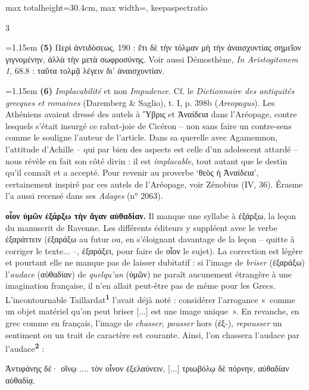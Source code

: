 \documentclass[11pt,twoside]{book}
\newcommand{\italique}[1]{\textit{#1}}
\newcommand{\citComm}[1]{\begin{quoting}[vskip=0.4pt,leftmargin=0.7em,rightmargin=0.2em]#1\end{quoting}}
\newcommand{\latin}[1]{\textit{#1}}
\newcommand{\marqueur}[1]{\textsuperscript{\color{rubricRed}\textbf{#1}}}
\begin{document}
\begin{adjustbox}{max totalheight=30.4cm, max width=\textwidth, keepaspectratio}
\begin{minipage}{\textwidth}
{\begin{multicols}{3}
\par\vspace{1.5pt}
\noindent\hangindent=1.15em {\color{sepiaNote}\textbf{(5)}} Περὶ ἀντιδόσεως, 190 : ἔτι δὲ τὴν τόλμαν μὴ τὴν ἀναισχυντίας σημεῖον γιγνομένην, ἀλλὰ τὴν μετὰ σωφροσύνης. Voir aussi Démosthène, \italique{In Aristogitonem 1}, 68.8 : ταῦτα τολμᾷ λέγειν δι' ἀναισχυντίαν.
\par\vspace{1.5pt}
\noindent\hangindent=1.15em {\color{sepiaNote}\textbf{(6)}} \italique{Implacabilité} et non \italique{Impudence}. Cf. le \italique{Dictionnaire des antiquités grecques et romaines} (Daremberg \& Saglio), t. I, p. 398b (\latin{Areopagus}). Les Athéniens avaient dressé des autels à Ὕβρις et Ἀναίδεια dans l'Aréopage, contre lesquels s'était insurgé ce rabat-joie de Cicéron -- non sans faire un contre-sens comme le souligne l'auteur de l'article. Dans sa querelle avec Agamemnon, l'attitude d'Achille -- qui par bien des aspects est celle d'un adolescent attardé -- nous révèle en fait son côté divin : il est \italique{implacable}, tout autant que le destin qu'il connaît et a accepté. Pour revenir au proverbe `θεὸς ἡ Ἀναίδεια', certainement inspiré par ces autels de l'Aréopage, voir Zénobius (IV, 36). Érasme l'a aussi recensé dans ses \italique{Adages} (n° 2063).
\par\vspace{1.5pt}
 \textbf{οἷον ὑμῶν ἐξάρξω τὴν ἄγαν αὐθαδίαν.} Il manque une syllabe à ἐξάρξω, la leçon du manuscrit de Ravenne. Les différents éditeurs y suppléent avec le verbe ἐξαράττειν (ἐξαράξω au futur ou, en s'éloignant davantage de la leçon -- quitte à corriger le texte... --, ἐξαράξει, pour faire de οἷον le sujet). La correction est légère et pourtant elle ne manque pas de laisser dubitatif : si l'image de \italique{briser} (ἐξαράξω) l'\italique{audace} (αὐθαδίαν) de \italique{quelqu'un} (ὑμῶν) ne paraît aucunement étrangère à une imagination française, il n'en allait peut-être pas de même pour les Grecs. L'incontournable Taillardat\marqueur{1} l'avait déjà noté : considérer l'arrogance «~comme un objet matériel qu'on peut briser [...] est une image unique~». En revanche, en grec comme en français, l'image de \italique{chasser}, \italique{pousser} hors (ἐξ-), \italique{repousser} un sentiment ou un trait de caractère est courante. Ainsi, l'on chassera l'audace par l'audace\marqueur{2} :
\citComm{Ἀντιφάνης δέ· οἴνῳ .... τὸν οἶνον ἐξελαύνειν, [...] τριωβόλῳ δὲ πόρνην, αὐθαδίαν αὐθαδίᾳ.}
\par\end{multicols}}
\end{minipage}\end{adjustbox}
\end{document}
